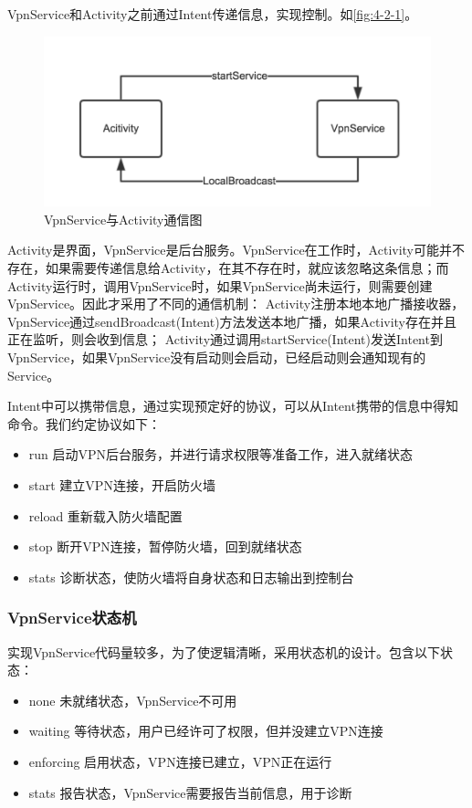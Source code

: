 \documentclass[format=final, language=chinese, degree=fyp]{hustthesis}
\begin{document}
VpnService和Activity之前通过Intent传递信息，实现控制。如\autoref{fig:4-2-1}。

\begin{figure}[h]
	\centering
	\includegraphics[width=.8\textwidth]{image_intent_commuciate.png}
	\caption{VpnService与Activity通信图}\label{fig:4-2-1}
\end{figure}

Activity是界面，VpnService是后台服务。VpnService在工作时，Activity可能并不存在，如果需要传递信息给Activity，在其不存在时，就应该忽略这条信息；而Activity运行时，调用VpnService时，如果VpnService尚未运行，则需要创建VpnService。因此才采用了不同的通信机制：
Activity注册本地本地广播接收器，VpnService通过sendBroadcast(Intent)方法发送本地广播，如果Activity存在并且正在监听，则会收到信息；
Activity通过调用startService(Intent)发送Intent到VpnService，如果VpnService没有启动则会启动，已经启动则会通知现有的Service。

Intent中可以携带信息，通过实现预定好的协议，可以从Intent携带的信息中得知命令。我们约定协议如下：
\begin{itemize}
    \item run     启动VPN后台服务，并进行请求权限等准备工作，进入就绪状态
    \item start   建立VPN连接，开启防火墙
    \item reload  重新载入防火墙配置
    \item stop    断开VPN连接，暂停防火墙，回到就绪状态
    \item stats   诊断状态，使防火墙将自身状态和日志输出到控制台
\end{itemize}

\subsubsection{VpnService状态机}

实现VpnService代码量较多，为了使逻辑清晰，采用状态机的设计。包含以下状态：
\begin{itemize}
    \item none          未就绪状态，VpnService不可用
    \item waiting       等待状态，用户已经许可了权限，但并没建立VPN连接
    \item enforcing     启用状态，VPN连接已建立，VPN正在运行
    \item stats         报告状态，VpnService需要报告当前信息，用于诊断
\end{itemize}
\end{document}
